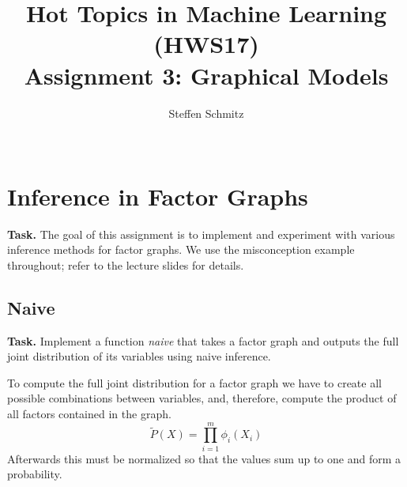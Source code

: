 \documentclass{support/acm_proc_article-sp}
\begin{document}
    \title{Hot Topics in Machine Learning (HWS17) \\ Assignment 3: Graphical Models}

    \author{
    \alignauthor
    Steffen Schmitz\\
    \\
    }

    \maketitle


    \section{Inference in Factor Graphs}

    \textbf{Task.} The goal of this assignment is to implement and experiment with various inference methods for factor graphs.
    We use the misconception example throughout;
    refer to the lecture slides for details.


    \subsection{Naive}

    \textbf{Task.} Implement a function \emph{naive} that takes a factor graph and outputs the full joint distribution
    of its variables using naive inference.

    To compute the full joint distribution for a factor graph we have to create all possible combinations between variables, and,
    therefore, compute the product of all factors contained in the graph.
    \begin{equation*}
        \tilde{P}(X) = \prod_{i = 1}^{m} \phi_i(X_i)
    \end{equation*}
    Afterwards this must be normalized so that the values sum up to one and form a probability.

\end{document}
